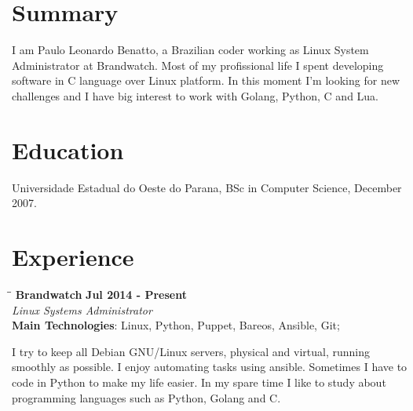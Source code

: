 \documentclass[margin]{res}
\begin{document}
  

\address{Brighton, UK \\ benatto@gmail.com \\ Phone: +44 07424600850 \\ Post Code: BN21HF }
                           
                        
\begin{resume}
 
\section{Summary}      I am Paulo Leonardo Benatto, a Brazilian coder working as Linux 
System Administrator at Brandwatch. Most of my profissional life I spent developing software
in C language over Linux platform. In this moment I'm looking for new challenges and I have 
big interest to work with Golang, Python, C and Lua. 
 
\section{Education}	Universidade Estadual do Oeste do Parana, BSc in Computer Science, December 2007.
  
\section{Experience}

\vspace{-0.1in}
   \begin{tabbing}
   \hspace{2.3in}\= \hspace{1.7in}\= \kill %
    \textbf{Brandwatch}    \>\>\textbf{Jul 2014 - Present}\\
    \textit{Linux Systems Administrator}\\        
    \textbf{Main Technologies}: Linux, Python, Puppet, Bareos, Ansible, Git;
   \end{tabbing}\vspace{-20pt}      %
    \vspace{2mm}
I try to keep all Debian GNU/Linux servers, physical and virtual, running smoothly as possible.
I enjoy automating tasks using ansible. Sometimes I have to code in Python to make my life easier.
In my spare time I like to study about programming languages such as Python, Golang and C.


\end{resume}
\end{document}
